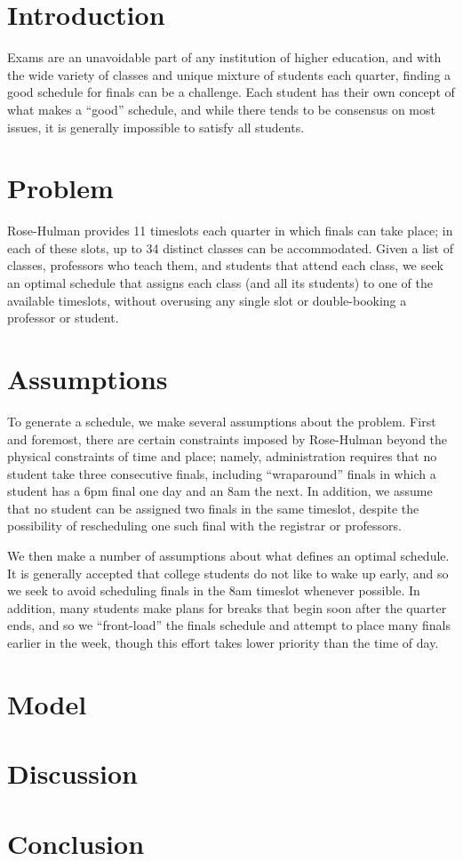 \documentclass{article}
\begin{document}

\section{Introduction}

Exams are an unavoidable part of any institution of higher education, and with the wide variety of classes and unique mixture of students each quarter, finding a good schedule for finals can be a challenge. Each student has their own concept of what makes a ``good'' schedule, and while there tends to be consensus on most issues, it is generally impossible to satisfy all students.

\section{Problem}

Rose-Hulman provides 11 timeslots each quarter in which finals can take place; in each of these slots, up to 34 distinct classes can be accommodated. Given a list of classes, professors who teach them, and students that attend each class, we seek an optimal schedule that assigns each class (and all its students) to one of the available timeslots, without overusing any single slot or double-booking a professor or student.

\section{Assumptions}

To generate a schedule, we make several assumptions about the problem. First and foremost, there are certain constraints imposed by Rose-Hulman beyond the physical constraints of time and place; namely, administration requires that no student take three consecutive finals, including ``wraparound'' finals in which a student has a 6pm final one day and an 8am the next. In addition, we assume that no student can be assigned two finals in the same timeslot, despite the possibility of rescheduling one such final with the registrar or professors.

We then make a number of assumptions about what defines an optimal schedule. It is generally accepted that college students do not like to wake up early, and so we seek to avoid scheduling finals in the 8am timeslot whenever possible. In addition, many students make plans for breaks that begin soon after the quarter ends, and so we ``front-load'' the finals schedule and attempt to place many finals earlier in the week, though this effort takes lower priority than the time of day.

\section{Model}



\section{Discussion}



\section{Conclusion}
\end{document}
